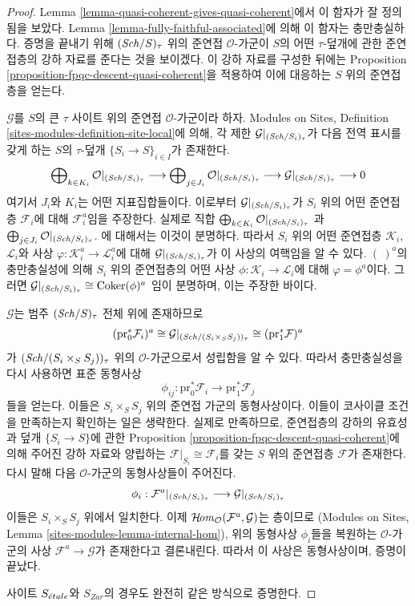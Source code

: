 \begin{proof}
Lemma \ref{lemma-quasi-coherent-gives-quasi-coherent}에서 이 함자가
잘 정의됨을 보았다. Lemma \ref{lemma-fully-faithful-associated}에 의해
이 함자는 충만충실하다. 증명을 끝내기 위해 $(\mathit{Sch}/S)_\tau$ 위의
준연접 $\mathcal{O}$-가군이 $S$의 어떤 $\tau$-덮개에 관한 준연접층의
강하 자료를 준다는 것을 보이겠다. 이 강하 자료를 구성한 뒤에는
Proposition \ref{proposition-fpqc-descent-quasi-coherent}을 적용하여
이에 대응하는 $S$ 위의 준연접층을 얻는다.

\medskip\noindent
$\mathcal{G}$를 $S$의 큰 $\tau$ 사이트 위의 준연접
$\mathcal{O}$-가군이라 하자. Modules on Sites, Definition
\ref{sites-modules-definition-site-local}에 의해, 각 제한
$\mathcal{G}|_{(\mathit{Sch}/S_i)_\tau}$가 다음 전역 표시를 갖게 하는
$S$의 $\tau$-덮개 $\{S_i \to S\}_{i \in I}$가 존재한다.
$$
\bigoplus\nolimits_{k \in K_i} \mathcal{O}|_{(\mathit{Sch}/S_i)_\tau}
\longrightarrow
\bigoplus\nolimits_{j \in J_i} \mathcal{O}|_{(\mathit{Sch}/S_i)_\tau}
\longrightarrow
\mathcal{G}|_{(\mathit{Sch}/S_i)_\tau} \longrightarrow 0
$$
여기서 $J_i$와 $K_i$는 어떤 지표집합들이다. 이로부터
$\mathcal{G}|_{(\mathit{Sch}/S_i)_\tau}$가 $S_i$ 위의 어떤 준연접층
$\mathcal{F}_i$에 대해 $\mathcal{F}_i^a$임을 주장한다. 실제로 직합
$\bigoplus\nolimits_{k \in K_i} \mathcal{O}|_{(\mathit{Sch}/S_i)_\tau}$
과
$\bigoplus\nolimits_{j \in J_i} \mathcal{O}|_{(\mathit{Sch}/S_i)_\tau}$.
에 대해서는 이것이 분명하다. 따라서 $S_i$ 위의 어떤 준연접층
$\mathcal{K}_i$, $\mathcal{L}_i$와 사상
$\varphi : \mathcal{K}_i^a \to \mathcal{L}_i^a$에 대해
$\mathcal{G}|_{(\mathit{Sch}/S_i)_\tau}$가 이 사상의 여핵임을 알 수 있다.
$(\ )^a$의 충만충실성에 의해 $S_i$ 위의 준연접층의 어떤 사상
$\phi : \mathcal{K}_i \to \mathcal{L}_i$에 대해
$\varphi = \phi^a$이다. 그러면
$\mathcal{G}|_{(\mathit{Sch}/S_i)_\tau} \cong \mathop{\mathrm{Coker}}(\phi)^a$
임이 분명하며, 이는 주장한 바이다.

\medskip\noindent
$\mathcal{G}$는 범주 $(\mathit{Sch}/S)_\tau$ 전체 위에 존재하므로
$$
(\text{pr}_0^*\mathcal{F}_i)^a
\cong
\mathcal{G}|_{(\mathit{Sch}/(S_i \times_S S_j))_\tau}
\cong
(\text{pr}_1^*\mathcal{F})^a
$$
가 $(\mathit{Sch}/(S_i \times_S S_j))_\tau$ 위의 $\mathcal{O}$-가군으로서
성립함을 알 수 있다. 따라서 충만충실성을 다시 사용하면 표준 동형사상
$$
\phi_{ij} :
\text{pr}_0^*\mathcal{F}_i
\longrightarrow
\text{pr}_1^*\mathcal{F}_j
$$
들을 얻는다. 이들은 $S_i \times_S S_j$ 위의 준연접 가군의
동형사상이다. 이들이 코사이클 조건을 만족하는지 확인하는 일은 생략한다.
실제로 만족하므로, 준연접층의 강하의 유효성과 덮개
$\{S_i \to S\}$에 관한 Proposition
\ref{proposition-fpqc-descent-quasi-coherent}에 의해 주어진 강하 자료와
양립하는 $\mathcal{F}|_{S_i} \cong \mathcal{F}_i$를 갖는 $S$ 위의
준연접층 $\mathcal{F}$가 존재한다. 다시 말해 다음 $\mathcal{O}$-가군의
동형사상들이 주어진다.
$$
\phi_i :
\mathcal{F}^a|_{(\mathit{Sch}/S_i)_\tau}
\longrightarrow
\mathcal{G}|_{(\mathit{Sch}/S_i)_\tau}
$$
이들은 $S_i \times_S S_j$ 위에서 일치한다. 이제
$\mathop{\mathcal{H}\!\mathit{om}}\nolimits_\mathcal{O}(\mathcal{F}^a, \mathcal{G})$는 층이므로
(Modules on Sites, Lemma \ref{sites-modules-lemma-internal-hom}),
위의 동형사상 $\phi_i$들을 복원하는 $\mathcal{O}$-가군의 사상
$\mathcal{F}^a \to \mathcal{G}$가 존재한다고 결론내린다. 따라서 이 사상은
동형사상이며, 증명이 끝났다.

\medskip\noindent
사이트 $S_{\acute{e}tale}$와 $S_{Zar}$의 경우도 완전히 같은 방식으로 증명한다.
\end{proof}

